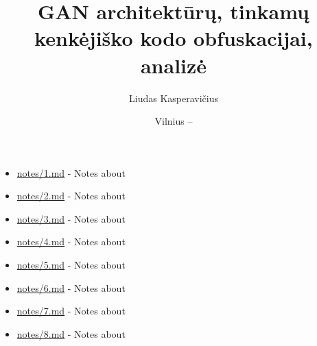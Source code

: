 \documentclass[
    english, %
]{VUMIFPSkursinis}
\title{GAN architektūrų, tinkamų kenkėjiško kodo obfuskacijai, analizė}
\author{Liudas Kasperavičius}
\date{Vilnius – \the\year}
\begin{document}
\maketitle

\tableofcontents


\begin{itemize}
    \item \url{notes/1.md} - Notes about \cite{nguyenGenerativeAdversarialNetworks2023}
    \item \url{notes/2.md} - Notes about \cite{zhongMalFoxCamouflagedAdversarial2024}
    \item \url{notes/3.md} - Notes about \cite{zhongReinforcementLearningBased2022}
    \item \url{notes/4.md} - Notes about \cite{kawaiImprovedMalGANAvoiding2019}
    \item \url{notes/5.md} - Notes about \cite{huGeneratingAdversarialMalware2017}
    \item \url{notes/6.md} - Notes about \cite{fangEvadingMalwareEngines2019}
    \item \url{notes/7.md} - Notes about \cite{zhuNgramMalGANEvading2022}
    \item \url{notes/8.md} - Notes about \cite{castroAIMEDEvolvingMalware2019}
\end{itemize}





\printbibliography[heading=bibintoc]


\end{document}
